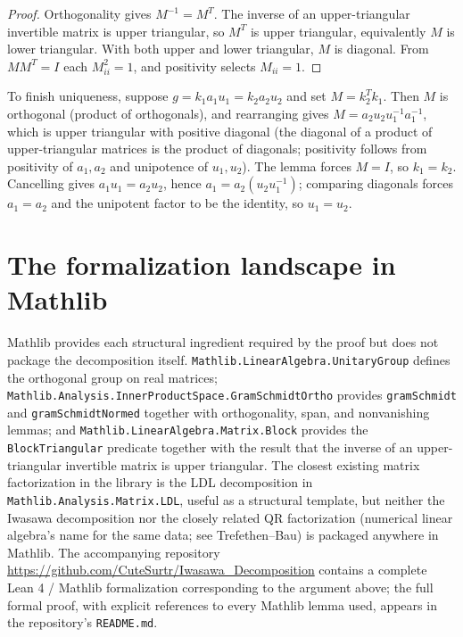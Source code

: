 \documentclass[11pt]{article}
\begin{document}
\begin{proof}
Orthogonality gives $M^{-1} = M^T$. The inverse of an upper-triangular
invertible matrix is upper triangular, so $M^T$ is upper triangular,
equivalently $M$ is lower triangular. With both upper and lower
triangular, $M$ is diagonal. From $M M^T = I$ each $M_{ii}^2 = 1$, and
positivity selects $M_{ii} = 1$.
\end{proof}

To finish uniqueness, suppose $g = k_1 a_1 u_1 = k_2 a_2 u_2$ and set
$M = k_2^T k_1$. Then $M$ is orthogonal (product of orthogonals), and
rearranging gives $M = a_2 u_2 u_1^{-1} a_1^{-1}$, which is upper
triangular with positive diagonal (the diagonal of a product of
upper-triangular matrices is the product of diagonals; positivity
follows from positivity of $a_1, a_2$ and unipotence of $u_1, u_2$).
The lemma forces $M = I$, so $k_1 = k_2$. Cancelling gives
$a_1 u_1 = a_2 u_2$, hence $a_1 = a_2(u_2 u_1^{-1})$; comparing
diagonals forces $a_1 = a_2$ and the unipotent factor to be the
identity, so $u_1 = u_2$.

\section*{The formalization landscape in Mathlib}

Mathlib provides each structural ingredient required by the proof but
does not package the decomposition itself.
\texttt{Mathlib.LinearAlgebra.UnitaryGroup} defines the orthogonal
group on real matrices;
\texttt{Mathlib.Analysis.InnerProductSpace.GramSchmidtOrtho} provides
\texttt{gramSchmidt} and \texttt{gramSchmidtNormed} together with
orthogonality, span, and nonvanishing lemmas; and
\texttt{Mathlib.LinearAlgebra.Matrix.Block} provides the
\texttt{BlockTriangular} predicate together with the result that the
inverse of an upper-triangular invertible matrix is upper triangular.
The closest existing matrix factorization in the library is the LDL
decomposition in \texttt{Mathlib.Analysis.Matrix.LDL}, useful as a
structural template, but neither the Iwasawa decomposition nor the
closely related QR factorization (numerical linear algebra's name for
the same data; see Trefethen--Bau) is packaged anywhere in Mathlib.
The accompanying repository
\url{https://github.com/CuteSurtr/Iwasawa_Decomposition} contains a
complete Lean 4 / Mathlib formalization corresponding to the argument
above; the full formal proof, with explicit references to every
Mathlib lemma used, appears in the repository's \texttt{README.md}.
\end{document}
